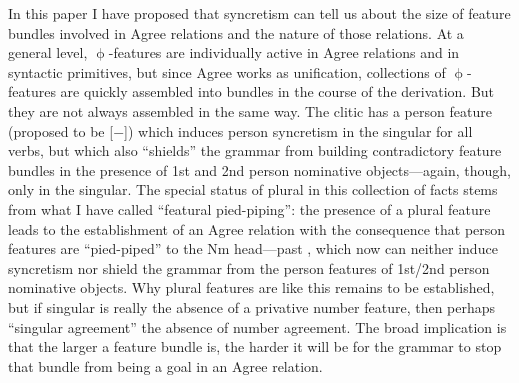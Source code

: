 \documentclass[output=paper,colorlinks,citecolor=brown,
]{langscibook}
\begin{document}
In this paper I have proposed that  syncretism can tell us about the size of feature bundles involved in  Agree relations and the nature of those relations. At a general level, $\upphi$-features are individually active in Agree relations and in syntactic primitives, but since Agree works as unification, collections of $\upphi$-features are quickly assembled into bundles in the course of the derivation. But they are not always assembled in the same way. The \stin{} clitic has a person feature (proposed to be [$-$]) which induces person syncretism in the singular for all \stin{} verbs, but which also ``shields'' the grammar from building contradictory feature bundles in the presence of 1st and 2nd person nominative objects---again, though, only in the singular. The special status of plural in this collection of facts stems from what I have called ``featural pied-piping'': the presence of a plural feature leads to the establishment of an Agree relation with the consequence that person features are ``pied-piped'' to the Nm head---past \stin{}, which now can neither induce syncretism nor shield the grammar from the person features of 1st/2nd person nominative objects. Why plural features are like this remains to be established, but if singular is really the absence of a privative number feature, then perhaps ``singular agreement''  the absence of number agreement. The broad implication is that the larger a feature bundle is, the harder it will be for the grammar to stop that bundle from being a goal in an Agree relation.  


\end{document}
